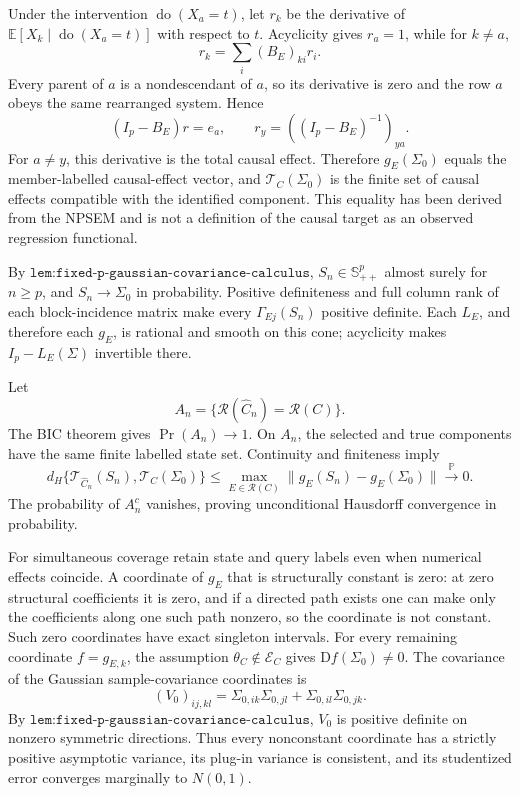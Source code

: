 Under the intervention \(\operatorname{do}(X_a=t)\), let \(r_k\) be the derivative of \(\mathbb E[X_k\mid\operatorname{do}(X_a=t)]\) with respect to \(t\). Acyclicity gives \(r_a=1\), while for \(k\neq a\),
\[
 r_k=\sum_i(B_E)_{ki}r_i.
\]
Every parent of \(a\) is a nondescendant of \(a\), so its derivative is zero and the row \(a\) obeys the same rearranged system. Hence
\[
 (I_p-B_E)r=e_a,
 \qquad
 r_y=((I_p-B_E)^{-1})_{ya}.
\]
For \(a\neq y\), this derivative is the total causal effect. Therefore \(g_E(\Sigma_0)\) equals the member-labelled causal-effect vector, and \(\mathcal T_C(\Sigma_0)\) is the finite set of causal effects compatible with the identified component. This equality has been derived from the NPSEM and is not a definition of the causal target as an observed regression functional.

By \(\texttt{lem:fixed-p-gaussian-covariance-calculus}\), \(S_n\in\mathbb S^p_{++}\) almost surely for \(n\geq p\), and \(S_n\to\Sigma_0\) in probability. Positive definiteness and full column rank of each block-incidence matrix make every \(\Gamma_{Ej}(S_n)\) positive definite. Each \(L_E\), and therefore each \(g_E\), is rational and smooth on this cone; acyclicity makes \(I_p-L_E(\Sigma)\) invertible there.

Let
\[
 A_n=\{\mathcal R(\widehat C_n)=\mathcal R(C)\}.
\]
The BIC theorem gives \(\Pr(A_n)\to1\). On \(A_n\), the selected and true components have the same finite labelled state set. Continuity and finiteness imply
\[
 d_H\{\mathcal T_{\widehat C_n}(S_n),\mathcal T_C(\Sigma_0)\}
 \leq\max_{E\in\mathcal R(C)}
 \|g_E(S_n)-g_E(\Sigma_0)\|
 \xrightarrow{\mathbb P}0.
\]
The probability of \(A_n^c\) vanishes, proving unconditional Hausdorff convergence in probability.

For simultaneous coverage retain state and query labels even when numerical effects coincide. A coordinate of \(g_E\) that is structurally constant is zero: at zero structural coefficients it is zero, and if a directed path exists one can make only the coefficients along one such path nonzero, so the coordinate is not constant. Such zero coordinates have exact singleton intervals. For every remaining coordinate \(f=g_{E,k}\), the assumption \(\theta_C\notin\mathcal E_C\) gives \(\mathrm Df(\Sigma_0)\neq0\). The covariance of the Gaussian sample-covariance coordinates is
\[
 (V_0)_{ij,kl}
 =\Sigma_{0,ik}\Sigma_{0,jl}+\Sigma_{0,il}\Sigma_{0,jk}.
\]
By \(\texttt{lem:fixed-p-gaussian-covariance-calculus}\), \(V_0\) is positive definite on nonzero symmetric directions. Thus every nonconstant coordinate has a strictly positive asymptotic variance, its plug-in variance is consistent, and its studentized error converges marginally to \(N(0,1)\).

